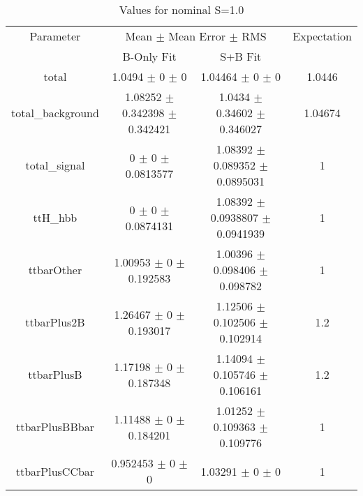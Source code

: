 \begin{table}
\centering
\caption{Values for nominal S=1.0}
\begin{tabular}{cccc}
\toprule
Parameter & \multicolumn{2}{c}{Mean $\pm$ Mean Error $\pm$ RMS} & Expectation\\
 & B-Only Fit & S+B Fit & \\
\midrule
total & \num{1.0494} $\pm$ \num{0} $\pm$ \num{0} & \num{1.04464} $\pm$ \num{0} $\pm$ \num{0} & \num{1.0446}\\
total\_background & \num{1.08252} $\pm$ \num{0.342398} $\pm$ \num{0.342421} & \num{1.0434} $\pm$ \num{0.34602} $\pm$ \num{0.346027} & \num{1.04674}\\
total\_signal & \num{0} $\pm$ \num{0} $\pm$ \num{0.0813577} & \num{1.08392} $\pm$ \num{0.089352} $\pm$ \num{0.0895031} & \num{1}\\
ttH\_hbb & \num{0} $\pm$ \num{0} $\pm$ \num{0.0874131} & \num{1.08392} $\pm$ \num{0.0938807} $\pm$ \num{0.0941939} & \num{1}\\
ttbarOther & \num{1.00953} $\pm$ \num{0} $\pm$ \num{0.192583} & \num{1.00396} $\pm$ \num{0.098406} $\pm$ \num{0.098782} & \num{1}\\
ttbarPlus2B & \num{1.26467} $\pm$ \num{0} $\pm$ \num{0.193017} & \num{1.12506} $\pm$ \num{0.102506} $\pm$ \num{0.102914} & \num{1.2}\\
ttbarPlusB & \num{1.17198} $\pm$ \num{0} $\pm$ \num{0.187348} & \num{1.14094} $\pm$ \num{0.105746} $\pm$ \num{0.106161} & \num{1.2}\\
ttbarPlusBBbar & \num{1.11488} $\pm$ \num{0} $\pm$ \num{0.184201} & \num{1.01252} $\pm$ \num{0.109363} $\pm$ \num{0.109776} & \num{1}\\
ttbarPlusCCbar & \num{0.952453} $\pm$ \num{0} $\pm$ \num{0} & \num{1.03291} $\pm$ \num{0} $\pm$ \num{0} & \num{1}\\
\bottomrule
\end{tabular}
\end{table}